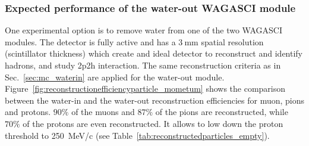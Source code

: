 \subsubsection{Expected performance of the water-out WAGASCI module}
One experimental option is to remove water from one of the two WAGASCI modules.
The detector is fully active and has a $3~$mm spatial resolution (scintillator thickness) which create and ideal detector to reconstruct and identify hadrons, and study 2p2h interaction.
The same reconstruction criteria as in Sec.~\ref{sec:mc_waterin} are applied for the water-out module.
Figure~\ref{fig:reconstructionefficiencyparticle_mometum} shows the comparison between the water-in and the water-out reconstruction efficiencies for muon, pions and protons.
$90\%$ of the muons and $87\%$ of the pions are reconstructed, while $70\%$ of the protons are even reconstructed.
It allows to low down the proton threshold to 250~MeV/c (see Table~\ref{tab:reconstructedparticles_empty}).     
